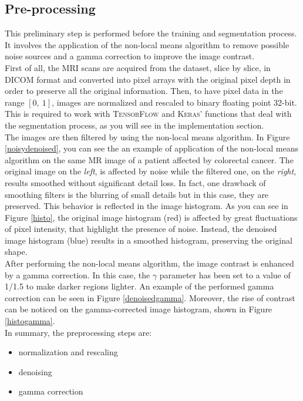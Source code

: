 \documentclass{standalone}
\begin{document}
\subsection{Pre-processing}

This preliminary step is performed before the training and segmentation process.
It involves the application of the non-local means algorithm to remove possible noise sources and a gamma correction to improve the image contrast.\\
First of all, the MRI scans are acquired from the dataset, slice by slice, in DICOM format and converted into pixel arrays with the original pixel depth in order to preserve all the original information.
Then, to have pixel data in the range $ [ 0, \: 1 ] $, images are normalized and rescaled to binary floating point 32-bit.
This is required to work with \textsc{TensorFlow}\cite{Tensorflow} and \textsc{Keras'} \cite{Keras} functions that deal with the segmentation process, as you will see in the implementation section.
\\
The images are then filtered by using the non-local means algorithm.
In Figure \ref{noisydenoised}, you can see the an example of application of the non-local means algorithm on the same MR image of a patient affected by colorectal cancer.
The original image on the \textit{left}, is affected by noise while the filtered one, on the \textit{right}, results smoothed without significant detail loss. 
In fact, one drawback of smoothing filters is the blurring of small details but in this case, they are preserved.
This behavior is reflected in the image histogram. 
As you can see in Figure \ref{histo}, the original image histogram (red) is affected by great fluctuations of pixel intensity, that highlight the presence of noise. 
Instead, the denoised image histogram (blue) results in a smoothed histogram, preserving the original shape.
\\
After performing the non-local means algorithm, the image contrast is enhanced by a gamma correction.
In this case, the $\gamma$ parameter has been set to a value of 1/1.5 to make darker regions lighter.
An example of the performed gamma correction can be seen in Figure \ref{denoisedgamma}.
Moreover, the rise of contrast can be noticed on the gamma-corrected image histogram, shown in Figure \ref{histogamma}.
\\
In summary, the preprocessing steps are:
\begin{itemize}
    \item normalization and rescaling
    \item denoising
    \item gamma correction
\end{itemize}
\end{document}
